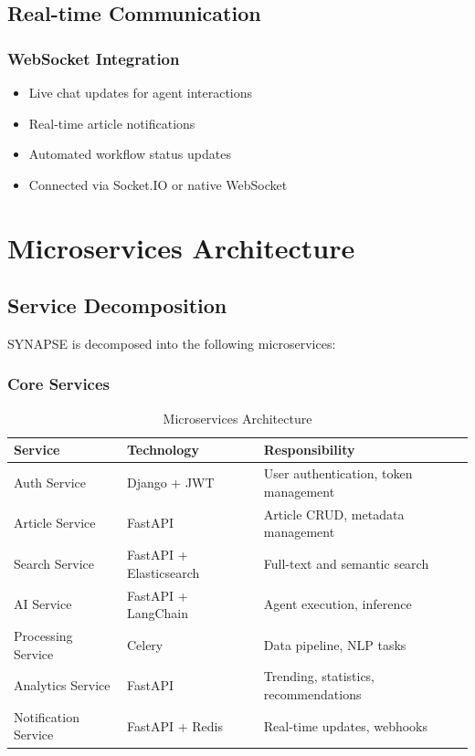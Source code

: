 \documentclass[12pt,a4paper]{report}
\begin{document}
\section{Real-time Communication}

\subsection{WebSocket Integration}

\begin{itemize}[label=\textbullet]
    \item Live chat updates for agent interactions
    \item Real-time article notifications
    \item Automated workflow status updates
    \item Connected via Socket.IO or native WebSocket
\end{itemize}

\newpage

\chapter{Microservices Architecture}

\section{Service Decomposition}

SYNAPSE is decomposed into the following microservices:

\subsection{Core Services}

\begin{table}[H]
\centering
\small
\begin{tabular}{|l|l|p{4cm}|}
\hline
\textbf{Service} & \textbf{Technology} & \textbf{Responsibility} \\
\hline
Auth Service & Django + JWT & User authentication, token management \\
Article Service & FastAPI & Article CRUD, metadata management \\
Search Service & FastAPI + Elasticsearch & Full-text and semantic search \\
AI Service & FastAPI + LangChain & Agent execution, inference \\
Processing Service & Celery & Data pipeline, NLP tasks \\
Analytics Service & FastAPI & Trending, statistics, recommendations \\
Notification Service & FastAPI + Redis & Real-time updates, webhooks \\
\hline
\end{tabular}
\caption{Microservices Architecture}
\end{table}
\end{document}
